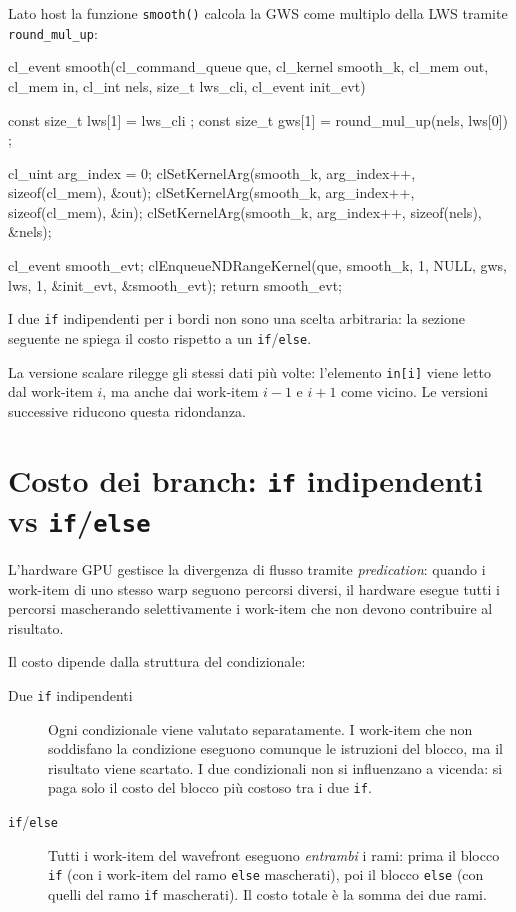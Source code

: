Lato host la funzione \texttt{smooth()} calcola la GWS come multiplo della LWS tramite \texttt{round\_mul\_up}:

\begin{code}[caption={Funzione host per il lancio del kernel smooth}, label={code:smooth_host_base}]
cl_event smooth(cl_command_queue que, cl_kernel smooth_k,
    cl_mem out, cl_mem in, cl_int nels,
    size_t lws_cli, cl_event init_evt)
{
    const size_t lws[1] = { lws_cli };
    const size_t gws[1] = { round_mul_up(nels, lws[0]) };

    cl_uint arg_index = 0;
    clSetKernelArg(smooth_k, arg_index++, sizeof(cl_mem), &out);
    clSetKernelArg(smooth_k, arg_index++, sizeof(cl_mem), &in);
    clSetKernelArg(smooth_k, arg_index++, sizeof(nels),   &nels);

    cl_event smooth_evt;
    clEnqueueNDRangeKernel(que, smooth_k, 1, NULL, gws, lws,
                           1, &init_evt, &smooth_evt);
    return smooth_evt;
}
\end{code}

I due \texttt{if} indipendenti per i bordi non sono una scelta arbitraria: la sezione seguente ne spiega il costo rispetto a un \texttt{if}/\texttt{else}.

La versione scalare rilegge gli stessi dati più volte: l'elemento \texttt{in[i]} viene letto dal work-item $i$, ma anche dai work-item $i-1$ e $i+1$ come vicino. Le versioni successive riducono questa ridondanza.

\section{Costo dei branch: \texttt{if} indipendenti vs \texttt{if}/\texttt{else}}\label{sec:opencl_lmem_branch}

L'hardware GPU gestisce la divergenza di flusso tramite \emph{predication}: quando i work-item di uno stesso warp seguono percorsi diversi, il hardware esegue tutti i percorsi mascherando selettivamente i work-item che non devono contribuire al risultato.

\noindent
Il costo dipende dalla struttura del condizionale:

\begin{description}
    \item[Due \texttt{if} indipendenti] Ogni condizionale viene valutato separatamente. I work-item che non soddisfano la condizione eseguono comunque le istruzioni del blocco, ma il risultato viene scartato. I due condizionali non si influenzano a vicenda: si paga solo il costo del blocco più costoso tra i due \texttt{if}.

    \item[\texttt{if}/\texttt{else}] Tutti i work-item del wavefront eseguono \emph{entrambi} i rami: prima il blocco \texttt{if} (con i work-item del ramo \texttt{else} mascherati), poi il blocco \texttt{else} (con quelli del ramo \texttt{if} mascherati). Il costo totale è la somma dei due rami.
\end{description}

